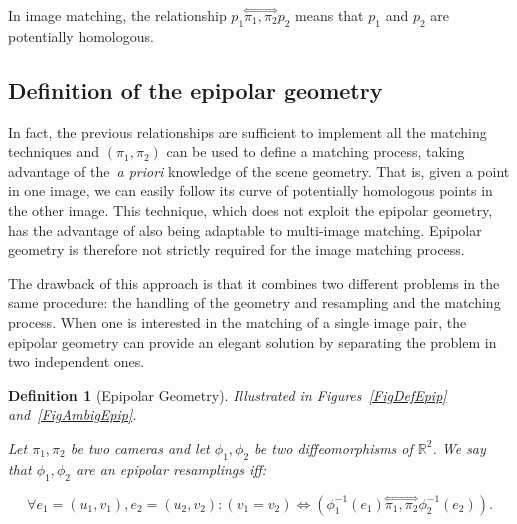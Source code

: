 \documentclass{ipol}
\newcommand{\RR}{\ensuremath{\mathbb{R}}}
\newcommand{\HComp}{\overset{\Longleftrightarrow}{\scriptscriptstyle \pi_1,\pi_2}}
\newtheorem{definition}{Definition}
\begin{document}
\noindent In image matching, the relationship $p_1 \HComp p_2$  means that $p_1$ and $p_2$ are potentially homologous.




\subsection{Definition of the epipolar geometry}

In fact, the previous relationships are sufficient to implement all the matching techniques and
$(\pi_1,\pi_2)$ can be used to define a matching process, taking advantage
of the~\emph{a priori} knowledge of the scene geometry. That is, given a point in one image, we can easily
follow its curve of potentially homologous points in the other image.
This technique, which does not exploit the epipolar geometry, has the advantage of also being adaptable to multi-image matching. Epipolar geometry is therefore not strictly required for the image matching process.

The drawback of this approach is that it combines two different problems in the same procedure: the handling of the geometry and resampling and
the matching process. When one is interested
in the matching of a single image pair, the epipolar geometry
can provide an elegant solution by separating the problem in two independent ones. 


\begin{definition}[Epipolar Geometry]
\emph{Illustrated in Figures~\ref{FigDefEpip} and~\ref{FigAmbigEpip}.}

Let $\pi_1,\pi_2$ be two cameras and let $\phi_1,\phi_2$  be two diffeomorphisms
of $\RR^2$. We say that $\phi_1,\phi_2$ are an epipolar resamplings iff:

\begin{equation}
  \forall e_1=(u_1,v_1) , e_2=(u_2,v_2) : (v_1=v_2)   \Leftrightarrow  (\phi_1^{-1}(e_1) \HComp \phi_2^{-1}(e_2)).
\end{equation}
   \label{EqEpiEgalY}
\end{definition}
\end{document}
